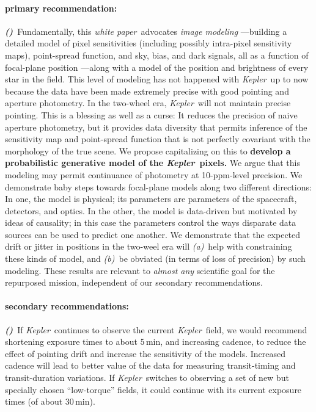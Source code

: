 \documentclass[letterpaper,12pt,preprint]{aastex}
\newcommand{\documentname}{\textsl{white paper}}
\newcommand{\observatory}[1]{\textsl{#1}}
\newcommand{\Kepler}{\observatory{Kepler}}
\newcounter{hoggitem}
\newcommand{\hoggitem}{\refstepcounter{hoggitem}\textbf{\textsl{(\thehoggitem)}}}
\begin{document}
\paragraph{primary recommendation:}
\hoggitem~Fundamentally, this \documentname\ advocates \emph{image modeling}%
  ---building a detailed model of pixel sensitivities
  (including possibly intra-pixel sensitivity maps),
  point-spread function,
  and sky, bias, and dark signals,
  all as a function of focal-plane position%
  ---along with a model of the position and brightness of every star in the field.
This level of modeling has not happened with \Kepler\ up to now
  because the data have been made extremely precise with good pointing
  and aperture photometry.
In the two-wheel era, \Kepler\ will not maintain precise pointing.
This is a blessing as well as a curse:
It reduces the precision of naive aperture photometry,
  but it provides data diversity that permits inference
  of the sensitivity map and point-spread function
  that is not perfectly covariant with the morphology of the true scene.
We propose capitalizing on this to
  \textbf{develop a probabilistic generative model of the \Kepler\ pixels.}
We argue that this modeling may permit continuance of photometry at 10-ppm-level precision.
We demonstrate baby steps towards focal-plane models
  along two different directions:
In one, the model is physical;
  its parameters are parameters of the spacecraft, detectors, and optics.
In the other, the model is data-driven but motivated by ideas of causality;
  in this case the parameters control the ways
  disparate data sources can be used to predict one another.
We demonstrate that the expected drift or jitter in positions in the two-weel era
  will \textsl{(a)}~help with constraining these kinds of model,
  and \textsl{(b)}~be obviated (in terms of loss of precision) by such modeling.
These results are relevant to \emph{almost any} scientific goal for the repurposed mission,
  independent of our secondary recommendations.

\paragraph{secondary recommendations:}
\hoggitem~If \Kepler\ continues to observe the current \Kepler\ field,
  we would recommend shortening exposure times to about 5\,min, and increasing cadence,
  to reduce the effect of pointing drift and increase the sensitivity of the models.
Increased cadence will lead to better value of the data for measuring
  transit-timing and transit-duration variations.
If \Kepler\ switches to observing a set of new but specially chosen ``low-torque'' fields,
  it could continue with its current exposure times (of about 30\,min).
\end{document}
